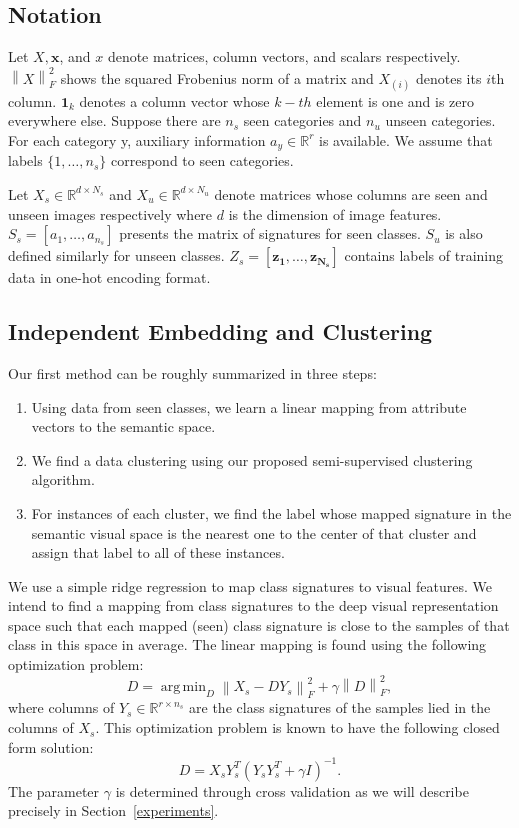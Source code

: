 \documentclass[letterpaper]{article}
\newcommand{\norm}[1]{\left \lVert #1 \right \rVert_{F}^2}
\DeclareMathOperator*{\argmin}{arg\,min}
\begin{document}
\subsection{Notation}
Let $X, \mathbf{x}$, and $x$ denote matrices, column vectors, and scalars respectively. $\norm{X}$ shows the squared Frobenius norm of a matrix and
$X_{(i)}$ denotes its $i$th column. $\mathbf{1}_k$ denotes a column vector whose $k-th$ element is one and is zero everywhere else.
Suppose there are $n_s$ seen categories and $n_u$ unseen categories. For each category y,
auxiliary information $a_y \in \mathbb{R}^r$ is available. We assume that labels $\{1, \ldots, n_s \}$ correspond to seen categories.

Let $X_s \in \mathbb{R}^{d \times N_s}$ and $X_u \in \mathbb{R}^{d \times N_u}$
denote matrices whose columns are seen and unseen images respectively where $d$ is the dimension of image features.
$S_s = [a_1, \ldots, a_{n_s}]$ presents the matrix of signatures for seen classes. $S_u$ is also defined similarly for unseen classes.
$Z_s = [ \mathbf{z_1}, \ldots, \mathbf{z_{N_s}} ]$
contains labels of training data in one-hot encoding format.

\subsection{Independent Embedding and Clustering} \label{clustering}
Our first method can be roughly summarized in three steps:
\begin{enumerate}
  \item Using data from seen classes, we learn a linear mapping from attribute vectors to the semantic space.
  \item We find a data clustering using our proposed semi-supervised clustering algorithm.
  \item For instances of each cluster, we find the label whose mapped signature in the semantic visual space is the nearest one to the center of that cluster and assign that label to all of these instances.
\end{enumerate}
We use a simple ridge regression to map class signatures to visual features. We intend to find a mapping from class signatures
 to the deep visual representation space such that each mapped (seen) class signature is close to the samples of that class in this space in average.
The linear mapping is found using the following optimization problem:
\begin{equation} \label{eq:mapping}
  D = \argmin_D \norm{X_s - D Y_s} + \gamma \norm{D},
\end{equation}
where columns of $ Y_s \in \mathbb{R}^{r \times n_s} $ are the class signatures of the samples lied in the columns of $X_s$.
This optimization problem is known to have the following closed form solution:
\begin{equation} \label{eq:dic}
  D = X_s Y_s^T (Y_s Y_s^T + \gamma I)^{-1}.
\end{equation}
The parameter $\gamma$ is determined through cross validation as we will describe precisely in Section~\ref{experiments}.
\end{document}
